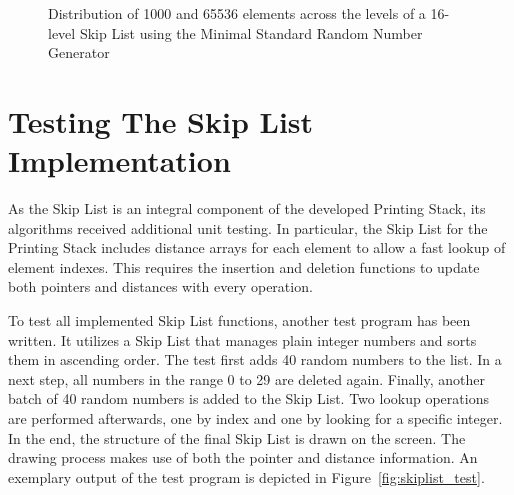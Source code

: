 \begin{figure}[t]
	\centering
	
	\hspace{8mm}
	
	\caption{Distribution of 1000 and 65536 elements across the levels of a 16-level Skip List using the Minimal Standard Random Number Generator}
	\label{fig:ElementDistribution}
\end{figure}


\section{Testing The Skip List Implementation}
As the Skip List is an integral component of the developed Printing Stack, its algorithms received additional unit testing.
In particular, the Skip List for the Printing Stack includes distance arrays for each element to allow a fast lookup of element indexes.
This requires the insertion and deletion functions to update both pointers and distances with every operation.

To test all implemented Skip List functions, another test program has been written.
It utilizes a Skip List that manages plain integer numbers and sorts them in ascending order.
The test first adds 40 random numbers to the list.
In a next step, all numbers in the range 0 to 29 are deleted again.
Finally, another batch of 40 random numbers is added to the Skip List.
Two lookup operations are performed afterwards, one by index and one by looking for a specific integer.
In the end, the structure of the final Skip List is drawn on the screen.
The drawing process makes use of both the pointer and distance information.
An exemplary output of the test program is depicted in Figure~\ref{fig:skiplist_test}.

